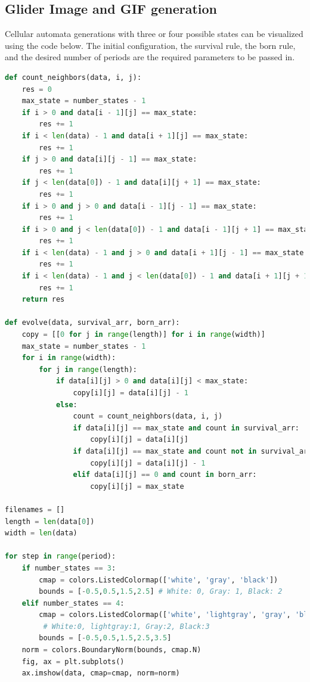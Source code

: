 \documentclass[12pt]{article}
\numberwithin{figure}{section} %
\begin{document}
\subsection{Glider Image and GIF generation}
Cellular automata generations with three or four possible states can be visualized using the code below. The initial configuration, the survival rule, the born rule, and the desired number of periods are the required parameters to be passed in. 
\begin{lstlisting}[language = Python]
def count_neighbors(data, i, j):
    res = 0
    max_state = number_states - 1
    if i > 0 and data[i - 1][j] == max_state:
        res += 1
    if i < len(data) - 1 and data[i + 1][j] == max_state:
        res += 1
    if j > 0 and data[i][j - 1] == max_state:
        res += 1
    if j < len(data[0]) - 1 and data[i][j + 1] == max_state:
        res += 1
    if i > 0 and j > 0 and data[i - 1][j - 1] == max_state: 
        res += 1
    if i > 0 and j < len(data[0]) - 1 and data[i - 1][j + 1] == max_state:
        res += 1
    if i < len(data) - 1 and j > 0 and data[i + 1][j - 1] == max_state:
        res += 1
    if i < len(data) - 1 and j < len(data[0]) - 1 and data[i + 1][j + 1] == max_state:
        res += 1
    return res

def evolve(data, survival_arr, born_arr): 
    copy = [[0 for j in range(length)] for i in range(width)]
    max_state = number_states - 1
    for i in range(width):
        for j in range(length):
            if data[i][j] > 0 and data[i][j] < max_state: 
                copy[i][j] = data[i][j] - 1
            else: 
                count = count_neighbors(data, i, j)
                if data[i][j] == max_state and count in survival_arr: 
                    copy[i][j] = data[i][j]
                if data[i][j] == max_state and count not in survival_arr: 
                    copy[i][j] = data[i][j] - 1
                elif data[i][j] == 0 and count in born_arr:
                    copy[i][j] = max_state

filenames = []
length = len(data[0])
width = len(data)

for step in range(period): 
    if number_states == 3: 
        cmap = colors.ListedColormap(['white', 'gray', 'black'])
        bounds = [-0.5,0.5,1.5,2.5] # White: 0, Gray: 1, Black: 2
    elif number_states == 4: 
        cmap = colors.ListedColormap(['white', 'lightgray', 'gray', 'black'])
	     # White:0, lightgray:1, Gray:2, Black:3
        bounds = [-0.5,0.5,1.5,2.5,3.5] 
    norm = colors.BoundaryNorm(bounds, cmap.N)
    fig, ax = plt.subplots()
    ax.imshow(data, cmap=cmap, norm=norm)


\end{lstlisting}
\end{document}
